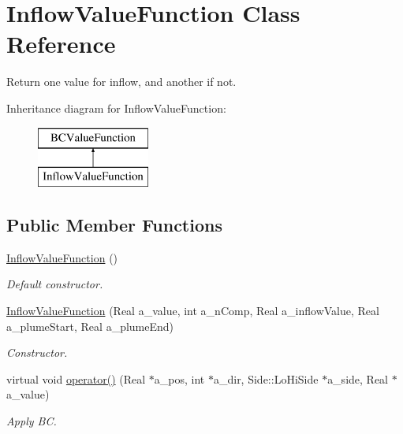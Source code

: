 \hypertarget{class_inflow_value_function}{\section{Inflow\-Value\-Function Class Reference}
\label{class_inflow_value_function}
}


Return one value for inflow, and another if not.  


Inheritance diagram for Inflow\-Value\-Function\-:\begin{figure}[H]
\begin{center}
\leavevmode
\includegraphics[height=2.000000cm]{class_inflow_value_function}
\end{center}
\end{figure}
\subsection*{Public Member Functions}
\begin{DoxyCompactItemize}
\item 
\hypertarget{class_inflow_value_function_aea9221992c346bbd12d03c3b7d86e47f}{\hyperlink{class_inflow_value_function_aea9221992c346bbd12d03c3b7d86e47f}{Inflow\-Value\-Function} ()}\label{class_inflow_value_function_aea9221992c346bbd12d03c3b7d86e47f}

\begin{DoxyCompactList}\small\item\em Default constructor. \end{DoxyCompactList}\item 
\hypertarget{class_inflow_value_function_a277df57c04250bc62a446a984a878546}{\hyperlink{class_inflow_value_function_a277df57c04250bc62a446a984a878546}{Inflow\-Value\-Function} (Real a\-\_\-value, int a\-\_\-n\-Comp, Real a\-\_\-inflow\-Value, Real a\-\_\-plume\-Start, Real a\-\_\-plume\-End)}\label{class_inflow_value_function_a277df57c04250bc62a446a984a878546}

\begin{DoxyCompactList}\small\item\em Constructor. \end{DoxyCompactList}\item 
\hypertarget{class_inflow_value_function_af9941db0cd9f74fc0a5133864cb7d141}{virtual void \hyperlink{class_inflow_value_function_af9941db0cd9f74fc0a5133864cb7d141}{operator()} (Real $\ast$a\-\_\-pos, int $\ast$a\-\_\-dir, Side\-::\-Lo\-Hi\-Side $\ast$a\-\_\-side, Real $\ast$a\-\_\-value)}\label{class_inflow_value_function_af9941db0cd9f74fc0a5133864cb7d141}

\begin{DoxyCompactList}\small\item\em Apply B\-C. \end{DoxyCompactList}\end{DoxyCompactItemize}
